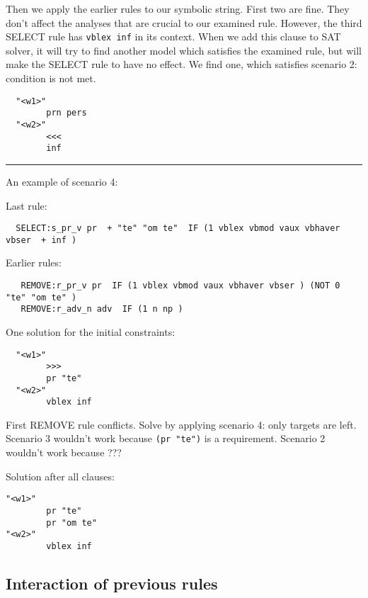 Then we apply the earlier rules to our symbolic string. First two are
fine. They don't affect the analyses that are crucial to our examined
rule. However, the third SELECT rule has \texttt{vblex inf} in its
context. When we add this clause to SAT solver, it will try to find
another model which satisfies the examined rule, but will make the
SELECT rule to have no effect. We find one, which satisfies scenario 2:
condition is not met.

\begin{verbatim}
  "<w1>"
        prn pers
  "<w2>"
        <<<
        inf
\end{verbatim}

\begin{center}\rule{3in}{0.4pt}\end{center}

An example of scenario 4:

Last rule:

\begin{verbatim}
  SELECT:s_pr_v pr  + "te" "om te"  IF (1 vblex vbmod vaux vbhaver vbser  + inf ) 
\end{verbatim}

Earlier rules:

\begin{verbatim}
   REMOVE:r_pr_v pr  IF (1 vblex vbmod vaux vbhaver vbser ) (NOT 0 "te" "om te" )
   REMOVE:r_adv_n adv  IF (1 n np )
\end{verbatim}

One solution for the initial constraints:

\begin{verbatim}
  "<w1>"
        >>>
        pr "te"
  "<w2>"
        vblex inf
\end{verbatim}

First REMOVE rule conflicts. Solve by applying scenario 4: only targets
are left. Scenario 3 wouldn't work because \texttt{(pr "te")} is a
requirement. Scenario 2 wouldn't work because ???

Solution after all clauses:

\begin{verbatim}
"<w1>"
        pr "te"
        pr "om te"
"<w2>"
        vblex inf
\end{verbatim}

\subsection{Interaction of previous
rules}\label{interaction-of-previous-rules}

